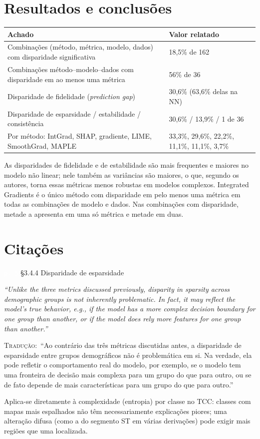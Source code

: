 \documentclass[11pt,a4paper]{article}
\newcommand{\pagechip}[1]{{\setlength{\fboxsep}{1.5pt}\colorbox{cAcc}{\textcolor{white}{\scriptsize\texttt{#1}}}}}
\newenvironment{origquote}{\par\itshape\small}{\par}
\newenvironment{tradquote}{\par\small\textsc{Tradução:}\ }{\par}
\newcommand{\explab}[1]{\par\smallskip{\small\color{cAcc}\textbf{\MakeUppercase{#1}}}\par}
\begin{document}
\section{Resultados e conclusões}
\begin{center}
\small
\begin{tabularx}{\linewidth}{Xl}
\toprule
Achado & Valor relatado \\
\midrule
Combinações (método, métrica, modelo, dados) com disparidade significativa & 18,5\% de 162 \\
Combinações método--modelo--dados com disparidade em ao menos uma métrica & 56\% de 36 \\
Disparidade de fidelidade (\textit{prediction gap}) & 30,6\% (63,6\% delas na NN) \\
Disparidade de esparsidade / estabilidade / consistência & 30,6\% / 13,9\% / 1 de 36 \\
Por método: IntGrad, SHAP, gradiente, LIME, SmoothGrad, MAPLE & 33,3\%, 29,6\%, 22,2\%, 11,1\%, 11,1\%, 3,7\% \\
\bottomrule
\end{tabularx}
\end{center}
As disparidades de fidelidade e de estabilidade são mais frequentes e maiores no modelo não linear; nele também as variâncias são maiores, o que, segundo os autores, torna essas métricas menos robustas em modelos complexos. Integrated Gradients é o único método com disparidade em pelo menos uma métrica em todas as combinações de modelo e dados. Nas combinações com disparidade, metade a apresenta em uma só métrica e metade em duas.

\section{Citações}

\begin{citacard}{\pagechip{p. 5} §3.4.4 Disparidade de esparsidade}
\begin{origquote}“Unlike the three metrics discussed previously, disparity in sparsity across demographic groups is not inherently problematic. In fact, it may reflect the model’s true behavior, e.g., if the model has a more complex decision boundary for one group than another, or if the model does rely more features for one group than another.”\end{origquote}
\begin{tradquote}“Ao contrário das três métricas discutidas antes, a disparidade de esparsidade entre grupos demográficos não é problemática em si. Na verdade, ela pode refletir o comportamento real do modelo, por exemplo, se o modelo tem uma fronteira de decisão mais complexa para um grupo do que para outro, ou se de fato depende de mais características para um grupo do que para outro.”\end{tradquote}
\explab{Explicação}
Aplica-se diretamente à complexidade (entropia) por classe no TCC: classes com mapas mais espalhados não têm necessariamente explicações piores; uma alteração difusa (como a do segmento ST em várias derivações) pode exigir mais regiões que uma localizada.
\end{citacard}
\end{document}
